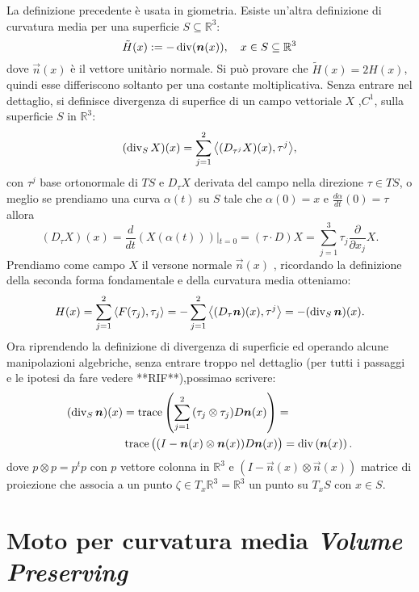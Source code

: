 \begin{osservazione}
La definizione precedente è usata in giometria. Esiste un'altra definizione di curvatura media per una superficie $S\subseteq\mathbb{R}^3$:
\begin{equation}
  \label{eq:cp-114}
  \tilde{H}(x):= -\operatorname{div}(\bm{n}(x)), \quad x\in S\subseteq\mathbb{R}^3
\end{equation}
dove $\vec{n}(x)$ è il vettore unitàrio normale.
Si può provare che $\tilde{H}(x)=2H(x)$, quindi esse differiscono soltanto per una costante moltiplicativa. Senza entrare nel dettaglio, si definisce divergenza di superfice di un campo vettoriale $X$ ,$C^1$, sulla superficie $S$ in $\mathbb{R}^3$:
\[
(\operatorname{div}_{S}X)(x) = \sum_{j=1}^{2}{\left<(D_{\tau^j} X)(x),\tau^j\right>},
\]
con $\tau^j$ base ortonormale di $TS$ e $D_\tau X$ derivata del campo nella direzione $\tau\in TS$, o meglio se prendiamo una curva $\alpha(t)$ su $S$ tale che $\alpha(0) = x$ e $\frac{d\alpha}{dt}(0)=\tau$ allora
\[
(D_\tau X)(x)=\frac{d}{dt}\left(X(\alpha(t))\right)\left|_{t=0}\right. =(\tau\cdot D)X=\sum_{j=1}^3\tau_j\frac{\partial}{\partial x_j}X.
\]
Prendiamo come campo $X$ il versone normale $\vec{n}(x)$ , ricordando la definizione della seconda forma fondamentale e della curvatura media otteniamo:
\[
H(x)= \sum_{j=1}^{2}{\left<F(\tau_j),\tau_j\right>} = -\sum_{j=1}^{2}{\left<(D_\tau \bm{n})(x),\tau^j\right>}=-(\operatorname{div}_{S}\bm{n})(x).
\]
Ora riprendendo la definizione di divergenza di superficie ed operando alcune manipolazioni algebriche, senza entrare troppo nel dettaglio (per tutti i passaggi e le ipotesi da fare vedere **RIF**),possimao scrivere:
\[
\begin{aligned}
(\operatorname{div}_{S}\bm{n})(x) &= \operatorname{trace}\left(\sum_{j=1}^2{(\tau_j\otimes\tau_j)}D\bm{n}(x)\right)=\\
&\operatorname{trace}\big((I-\bm{n}(x)\otimes\bm{n}(x))D\bm{n}(x)\big)=\operatorname{div}\left(\bm{n}(x)\right).
\end{aligned}
\]
dove $p\otimes p=p^tp$ con $p$ vettore colonna in $\mathbb{R}^3$ e $(I-\vec{n}(x)\otimes\vec{n}(x))$ matrice di proiezione che associa a un punto $\zeta \in T_x\mathbb{R}^3=\mathbb{R}^3$ un punto su $T_xS$ con $x\in S$.
\end{osservazione}
%
%
\section{Moto per curvatura media \emph{Volume Preserving}}

